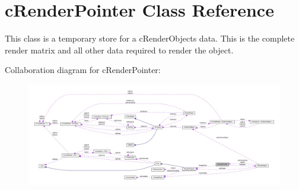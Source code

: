 \hypertarget{classc_render_pointer}{
\section{cRenderPointer Class Reference}
\label{classc_render_pointer}
}


This class is a temporary store for a cRenderObjects data. This is the complete render matrix and all other data required to render the object.  




Collaboration diagram for cRenderPointer:\nopagebreak
\begin{figure}[H]
\begin{center}
\leavevmode
\includegraphics[width=400pt]{classc_render_pointer__coll__graph}
\end{center}
\end{figure}
